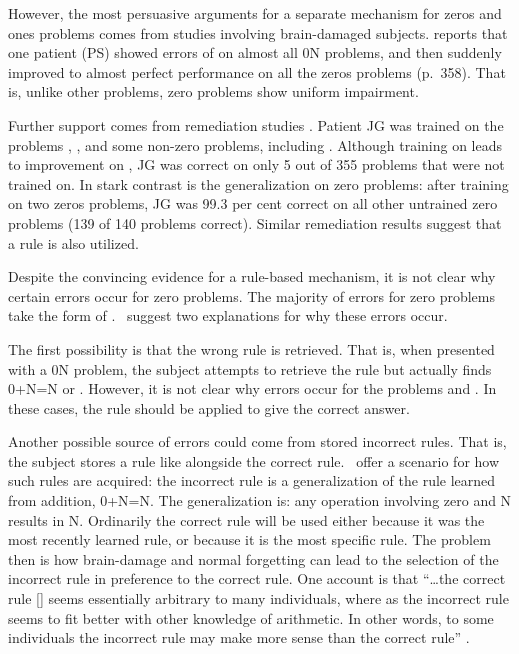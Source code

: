 However, the most persuasive arguments for a separate mechanism for zeros
and ones problems comes from studies involving brain-damaged subjects.
 reports that one patient (PS) showed errors
of  on almost all \x0N problems, and then suddenly improved to
almost perfect performance on all the zeros
problems (p.~358).  That is, unlike
other problems, zero problems show uniform impairment.

Further support comes from remediation studies \cite[p.~186--7]{mcclfact}.
Patient JG was trained on the problems
, , and some non-zero problems,
including .  Although training on  leads to improvement on , JG
was correct on only 5
out of 355 problems that were not trained on.  In stark
contrast is the generalization on zero problems: after training on two
zeros problems, JG was 99.3 per cent correct on all other untrained zero
problems (139 of 140 problems correct). Similar remediation results suggest
that a rule  is also utilized.

Despite the convincing evidence for a rule-based mechanism,
it is not clear why certain errors occur
for zero problems. The majority of errors for zero problems take the form
of  \cite{harlasso}. \citeauthor{mcclfact}\ suggest two
explanations
for why these errors occur.

The first possibility is that the wrong rule is retrieved.  That is, when
presented with a \x0N problem, the subject attempts to retrieve the rule
 but actually finds 0+N=N or .  However, it is
not clear why  errors occur for the problems  and .
In these cases, the rule  should be applied to give the
correct answer.

Another possible source of  errors could come from stored
incorrect rules.  That is, the subject stores a
rule like  alongside the correct rule.
\citeauthor{mcclfact}\ offer a scenario for how
such rules are acquired:  the incorrect rule  is a
generalization of the rule learned from addition, 0+N=N. The
generalization is: any operation involving zero and N results in N.
Ordinarily the
correct rule
will be used either because it was the most
recently learned rule, or because
it is the most specific rule.  The problem then is how brain-damage and
normal forgetting can lead to the selection of the incorrect rule in
preference to the correct rule.  One account is that ``\ldots the correct
rule [] seems
essentially arbitrary to many individuals, where as the
incorrect rule seems to fit better with other knowledge of arithmetic. In
other words, to some individuals the incorrect rule may make more sense
than the correct rule'' \cite[p.~192]{mcclfact}.


